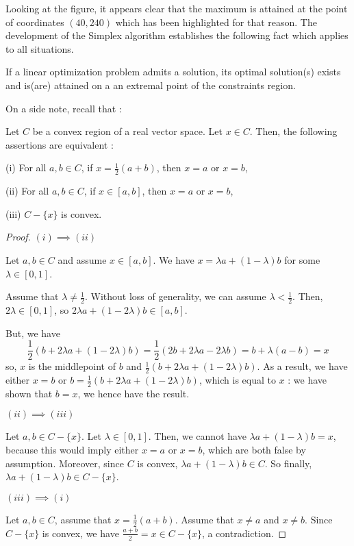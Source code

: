 Looking at the figure, it appears clear that the maximum is attained at the point of coordinates $ (40,240) $ which has been highlighted for that reason. The development of the Simplex algorithm establishes the following fact which applies to all situations.

\begin{theorem}
    If a linear optimization problem admits a solution, its optimal solution(s) exists and is(are) attained on a an extremal point of the constraints region.
\end{theorem}

On a side note, recall that :

\begin{proposition}\label{prop:extremal-points}
    Let $ C $ be a convex region of a real vector space. Let $ x \in C $. Then, the following assertions are equivalent :

    (i) For all $ a,b \in C $, if $ x = \frac 1 2 (a+b) $, then $ x = a $ or $ x = b $,

    (ii) For all $ a,b \in C $, if $ x \in [a,b] $, then $ x = a $ or $ x = b $,

    (iii) $ C - \{ x \} $ is convex.
\end{proposition}

\begin{proof}
    $ (i) \implies (ii) $
    
    Let $ a,b \in C $ and assume $ x \in [a,b] $. We have $ x = \lambda a + (1-\lambda) b $ for some $ \lambda \in [0,1] $.

    Assume that $ \lambda \neq \frac 1 2 $. Without loss of generality, we can assume $ \lambda < \frac 1 2 $. Then, $ 2\lambda \in [0,1] $, so $ 2\lambda a + (1-2\lambda) b \in [a,b] $.

    But, we have
    \[
        \frac 1 2 (b + 2\lambda a + (1-2\lambda)b) = \frac 1 2 (2b + 2\lambda a - 2\lambda b) = b + \lambda (a - b) = x
    \]
    so, $ x $ is the middlepoint of $ b $ and $ \frac 1 2 (b + 2\lambda a + (1-2\lambda)b) $. As a result, we have either $ x = b $ or $ b = \frac 1 2 (b + 2\lambda a + (1-2\lambda)b )$, which is equal to $ x $ : we have shown that $ b = x $, we hence have the result.

    $ (ii) \implies (iii) $
    
    Let $ a,b \in C - \{ x \} $. Let $ \lambda \in [0,1] $. Then, we cannot have $ \lambda a + (1-\lambda) b = x $, because this would imply either $ x = a $ or $ x = b $, which are both false by assumption. Moreover, since $ C $ is convex, $ \lambda a + (1-\lambda) b \in C $. So finally, $ \lambda a + (1-\lambda) b \in C - \{ x \}$. 
    
    $ (iii) \implies (i) $

    Let $ a,b \in C $, assume that $ x = \frac 1 2 (a+b) $. Assume that $ x \neq a $ and $ x \neq b $. Since $ C - \{ x \} $ is convex, we have $ \frac{a+b}{2} = x \in C - \{ x \}$, a contradiction.
\end{proof}

